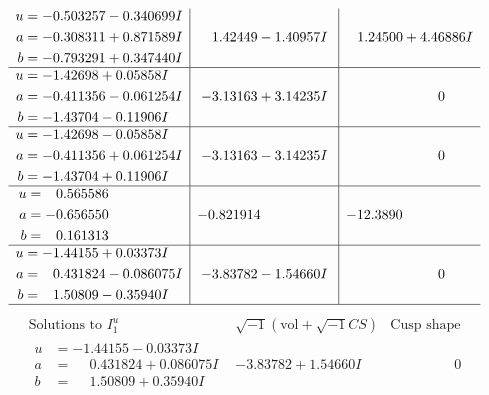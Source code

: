 \documentclass[1p]{elsarticle_modified}
\theoremstyle{definition}
\newcommand{\I}{\sqrt{-1}}
\begin{document}
$$\begin{array}{c|c|c}
\begin{aligned}
u &= -0.503257 - 0.340699 I \\
a &= -0.308311 + 0.871589 I \\
b &= -0.793291 + 0.347440 I\end{aligned}
 & \phantom{-}1.42449 - 1.40957 I & \phantom{-}1.24500 + 4.46886 I \\ \hline\begin{aligned}
u &= -1.42698 + 0.05858 I \\
a &= -0.411356 - 0.061254 I \\
b &= -1.43704 - 0.11906 I\end{aligned}
 & -3.13163 + 3.14235 I & \phantom{-0.000000 } 0 \\ \hline\begin{aligned}
u &= -1.42698 - 0.05858 I \\
a &= -0.411356 + 0.061254 I \\
b &= -1.43704 + 0.11906 I\end{aligned}
 & -3.13163 - 3.14235 I & \phantom{-0.000000 } 0 \\ \hline\begin{aligned}
u &= \phantom{-}0.565586\phantom{ +0.000000I} \\
a &= -0.656550\phantom{ +0.000000I} \\
b &= \phantom{-}0.161313\phantom{ +0.000000I}\end{aligned}
 & -0.821914\phantom{ +0.000000I} & -12.3890\phantom{ +0.000000I} \\ \hline\begin{aligned}
u &= -1.44155 + 0.03373 I \\
a &= \phantom{-}0.431824 - 0.086075 I \\
b &= \phantom{-}1.50809 - 0.35940 I\end{aligned}
 & -3.83782 - 1.54660 I & \phantom{-0.000000 } 0\\
 \hline 
 \end{array}$$\newpage$$\begin{array}{c|c|c}  
\text{Solutions to }I^u_{1}& \I (\text{vol} + \sqrt{-1}CS) & \text{Cusp shape}\\
 \hline 
\begin{aligned}
u &= -1.44155 - 0.03373 I \\
a &= \phantom{-}0.431824 + 0.086075 I \\
b &= \phantom{-}1.50809 + 0.35940 I\end{aligned}
 & -3.83782 + 1.54660 I & \phantom{-0.000000 } 0 \\ \hline\begin{aligned}

\end{aligned}
\end{array}$$
\end{document}
